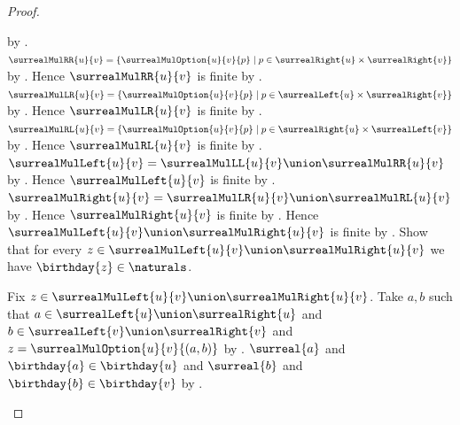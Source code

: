 \begin{proof}
\begin{subproof}
\begin{subproof}
                by .
            $\surrealMulRR{u}{v}
                =\{\surrealMulOption{u}{v}{p}\mid
                    p\in\surrealRight{u}\times\surrealRight{v}\}$
                by .
            Hence $\surrealMulRR{u}{v}$ is finite
                by .
            $\surrealMulLR{u}{v}
                =\{\surrealMulOption{u}{v}{p}\mid
                    p\in\surrealLeft{u}\times\surrealRight{v}\}$
                by .
            Hence $\surrealMulLR{u}{v}$ is finite
                by .
            $\surrealMulRL{u}{v}
                =\{\surrealMulOption{u}{v}{p}\mid
                    p\in\surrealRight{u}\times\surrealLeft{v}\}$
                by .
            Hence $\surrealMulRL{u}{v}$ is finite
                by .
            $\surrealMulLeft{u}{v}
                =\surrealMulLL{u}{v}\union\surrealMulRR{u}{v}$
                by
                .
            Hence $\surrealMulLeft{u}{v}$ is finite
                by .
            $\surrealMulRight{u}{v}
                =\surrealMulLR{u}{v}\union\surrealMulRL{u}{v}$
                by
                .
            Hence $\surrealMulRight{u}{v}$ is finite
                by .
            Hence $\surrealMulLeft{u}{v}\union
                \surrealMulRight{u}{v}$ is finite
                by .
            Show that for every $z\in
                \surrealMulLeft{u}{v}\union\surrealMulRight{u}{v}$
                we have $\birthday{z}\in\naturals$.
            \begin{subproof}
                Fix $z\in\surrealMulLeft{u}{v}\union
                    \surrealMulRight{u}{v}$.
                Take $a,b$ such that
                    $a\in\surrealLeft{u}\union\surrealRight{u}$ and
                    $b\in\surrealLeft{v}\union\surrealRight{v}$ and
                    $z=\surrealMulOption{u}{v}{(a,b)}$
                    by
                    .
                $\surreal{a}$ and $\birthday{a}\in\birthday{u}$ and
                    $\surreal{b}$ and $\birthday{b}\in\birthday{v}$
                    by
                    .

\end{subproof}
\end{subproof}
\end{subproof}
\end{proof}
